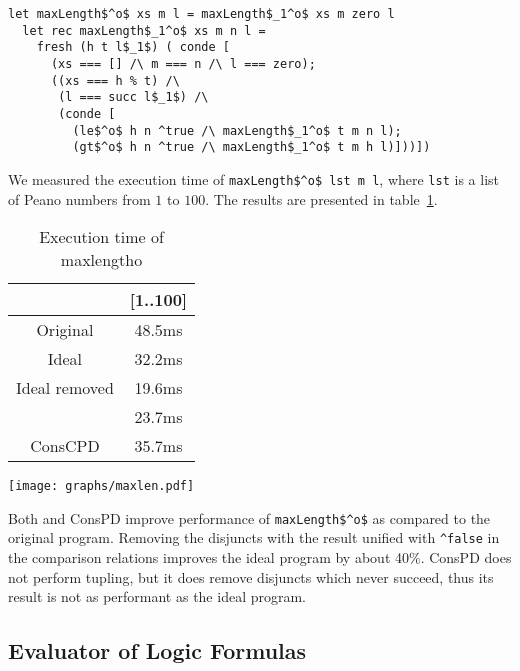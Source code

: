 \begin{figure*}[!h]
  \centering
  \begin{minipage}{0.7\textwidth}
\begin{lstlisting}[label={ideal:maxandlength}, caption={Ideal implementation of maxlengtho}, captionpos=b, frame=tb]
  let maxLength$^o$ xs m l = maxLength$_1^o$ xs m zero l
  let rec maxLength$_1^o$ xs m n l =
    fresh (h t l$_1$) ( conde [
      (xs === [] /\ m === n /\ l === zero);
      ((xs === h % t) /\
       (l === succ l$_1$) /\
       (conde [
         (le$^o$ h n ^true /\ maxLength$_1^o$ t m n l);
         (gt$^o$ h n ^true /\ maxLength$_1^o$ t m h l)]))])
  \end{lstlisting}
\end{minipage}
\end{figure*}

We measured the execution time of \lstinline{maxLength$^o$ lst m l}, where \lstinline{lst} is a list of Peano numbers from $1$ to $100$.
The results are presented in table~\ref{tbl:maxlen}.


\begin{table}
  \centering
  \begin{tabular}{c||c}
                   & [1..100] \\ \hline\hline
  Original         & 48.5ms  \\ \hline
  Ideal            & 32.2ms  \\ \hline
  Ideal removed    & 19.6ms  \\ \hline
  \ecce            & 23.7ms  \\ \hline
  ConsCPD          & 35.7ms
  \end{tabular}

  \caption{Execution time of maxlengtho}
  \label{tbl:maxlen}
\end{table}

\texttt{[image: graphs/maxlen.pdf]}

Both \ecce and ConsPD improve performance of \lstinline{maxLength$^o$} as compared to the original program.
Removing the disjuncts with the result unified with \lstinline{^false} in the comparison relations improves the ideal program by about 40\%.
ConsPD does not perform tupling, but it does remove disjuncts which never succeed, thus its result is not as performant as the ideal program.


\subsection{Evaluator of Logic Formulas}

